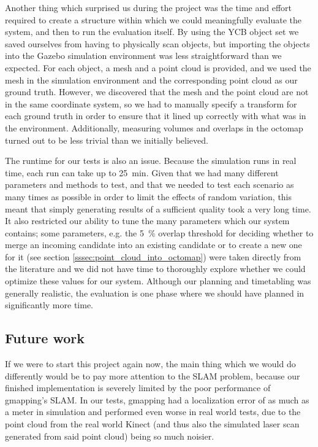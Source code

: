 
Another thing which surprised us during the project was the time and effort required to create a structure within which we could meaningfully evaluate the system, and then to run the evaluation itself.
By using the YCB object set we saved ourselves from having to physically scan objects, but importing the objects into the Gazebo simulation environment was less straightforward than we expected.
For each object, a mesh and a point cloud is provided, and we used the mesh in the simulation environment and the corresponding point cloud as our ground truth.
However, we discovered that the mesh and the point cloud are not in the same coordinate system, so we had to manually specify a transform for each ground truth in order to ensure that it lined up correctly with what was in the environment.
Additionally, measuring volumes and overlaps in the octomap turned out to be less trivial than we initially believed.

The runtime for our tests is also an issue. Because the simulation runs in real time, each run can take up to \SI{25}{\minute}.
Given that we had many different parameters and methods to test, and that we needed to test each scenario as many times as possible in order to limit the effects of random variation, this meant that simply generating results of a sufficient quality took a very long time.
It also restricted our ability to tune the many parameters which our system contains; some parameters, e.g. the \SI{5}{\percent} overlap threshold for deciding whether to merge an incoming candidate into an existing candidate or to create a new one for it (see section \ref{sssec:point_cloud_into_octomap}) were taken directly from the literature and we did not have time to thoroughly explore whether we could optimize these values for our system.
Although our planning and timetabling was generally realistic, the evaluation is one phase where we should have planned in significantly more time.

\subsection{Future work}

If we were to start this project again now, the main thing which we would do differently would be to pay more attention to the SLAM problem, because our finished implementation is severely limited by the poor performance of gmapping's SLAM.
In our tests, gmapping had a localization error of as much as a meter in simulation and performed even worse in real world tests, due to the point cloud from the real world Kinect (and thus also the simulated laser scan generated from said point cloud) being so much noisier.

